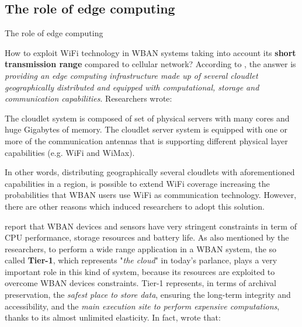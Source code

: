 \documentclass[10pt]{beamer}
\begin{document}
\subsection{The role of edge computing}
\begin{frame}{The role of edge computing} 

How to exploit WiFi technology in WBAN systems taking into account its \textbf{short transmission range} compared to cellular network? According to \citet{MSAReport}, the answer is \textit{providing an edge computing infrastructure made up of several cloudlet geographically distributed and equipped with computational, storage and communication capabilities}. Researchers wrote:

\vspace{0.3cm}

\begin{quoting}[font=itshape, begintext={``}, endtext={''\cite[par.~4.1]{MSAReport}}]
The cloudlet system is composed of set of physical servers with many cores and huge Gigabytes of memory. The cloudlet server system is equipped with one or more of the communication antennas that is supporting different physical layer capabilities (e.g. WiFi and WiMax). 
\end{quoting}

\vspace{0.3cm}

In other words, distributing geographically several cloudlets with aforementioned capabilities in a region, is possible to extend WiFi coverage increasing the probabilities that WBAN users use WiFi as communication technology. However, there are other reasons which induced researchers to adopt this solution. 

\citet{MSAReport} report that WBAN devices and sensors have very stringent constraints in term of CPU performance, storage resources and battery life. As also mentioned by the researchers, to perform a wide range application in a WBAN system, the so called \textbf{Tier-1}, which represents "\textit{the cloud}" in today's parlance, plays a very important role in this kind of system, because its resources are exploited to overcome WBAN devices constraints. Tier-1 represents, in terms of archival preservation, the \textit{safest place to store data}, ensuring the long-term integrity and accessibility, and the \textit{main execution site to perform expensive computations}, thanks to its almost unlimited elasticity. In fact, \citet{MSAReport} wrote that:


\end{frame}
\end{document}
